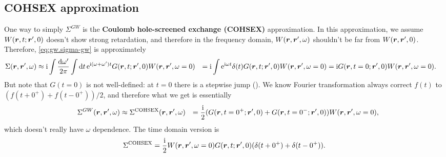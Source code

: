 \documentclass[hyperref, a4paper, 12pt]{report}
\newcommand*{\ii}{\mathrm{i}}
\newcommand*{\ee}{\mathrm{e}}
\newcommand*{\concept}[1]{{\textbf{#1}}}
\def\\{}%
\begin{document}
\subsection{COHSEX approximation}\label{sec:cohsex-approx-1}

One way to simply $\Sigma^{GW}$ is the 
\concept{Coulomb hole-screened exchange (COHSEX)} approximation.
In this approximation, 
we assume $W(\vb*{r}, t; \vb*{r}', 0)$ doesn't show strong retardation,
and therefore in the frequency domain, 
$W(\vb*{r}, \vb*{r}', \omega)$ shouldn't be far from $W(\vb*{r}, \vb*{r}', 0)$.
Therefore, \eqref{eq:gw.sigma-gw} is approximately 
\[
    \begin{aligned}
        \Sigma(\vb*{r}, \vb*{r}', \omega) &\approx \ii 
        \int \frac{\dd{\omega'}}{2\pi} \int \dd{t} \ee^{\ii (\omega + \omega') t} 
        G(\vb*{r}, t; \vb*{r}', 0) W(\vb*{r}, \vb*{r}', \omega = 0) \\
        &= \ii \int \ee^{\ii \omega t} \delta(t) G(\vb*{r}, t; \vb*{r}', 0) W(\vb*{r}, \vb*{r}', \omega = 0) \\
        &= \ii G(\vb*{r}, t = 0; \vb*{r}', 0) W(\vb*{r}, \vb*{r}', \omega = 0).
    \end{aligned}
\]
But note that $G(t = 0)$ is not well-defined: 
at $t = 0$ there is a stepwise jump ().
We know Fourier transformation 
always correct $f(t)$ to $(f(t + 0^+) + f(t - 0^+)) / 2$,
and therefore what we get is essentially 
\begin{equation}
    \begin{aligned}
        &\quad \Sigma^{GW}(\vb*{r}, \vb*{r}', \omega) \approx
        \Sigma^{\text{COHSEX}} (\vb*{r}, \vb*{r}', \omega) \\
        &= \frac{\ii}{2} (
            G(\vb*{r}, t = 0^+; \vb*{r}', 0) + 
            G(\vb*{r}, t = 0^-; \vb*{r}', 0)
        ) W(\vb*{r}, \vb*{r}', \omega = 0),
    \end{aligned}
\end{equation}
which doesn't really have $\omega$ dependence.
The time domain version is 
\begin{equation}
    \Sigma^{\text{COHSEX}} = \frac{\ii}{2}
    W(\vb*{r}, \vb*{r}', \omega = 0)
    G(\vb*{r}, t; \vb*{r}', 0)
    (\delta(t + 0^+) + \delta(t - 0^+)).
\end{equation}
\end{document}
